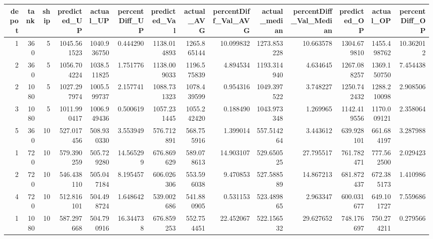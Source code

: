 \begin{tabular}{rrrrrrrrrrrrrr}
\toprule
 depot &  tank &  ship &  predicted\_UP &   actual\_UP &  percentDiff\_UP &  predicted\_Val &  actual\_AVG &  percentDiff\_Val\_AVG &  actual\_median &  percentDiff\_Val\_Median &  predicted\_OP &   actual\_OP &  percentDiff\_OP \\
\midrule
     1 &   360 &     5 &   1045.561523 & 1040.936750 &        0.444290 &    1138.014893 & 1265.865144 &            10.099832 &    1273.853228 &               10.663578 &   1304.679810 & 1455.498762 &       10.362012 \\
     2 &   360 &     5 &   1056.704224 & 1038.511825 &        1.751776 &    1138.009033 & 1196.575839 &             4.894534 &    1193.314940 &                4.634645 &   1267.088257 & 1369.150750 &        7.454438 \\
     2 &  1080 &     5 &   1027.297974 & 1005.599737 &        2.157741 &    1088.731323 & 1078.439599 &             0.954316 &    1049.397522 &                3.748227 &   1250.742432 & 1288.210098 &        2.908506 \\
     3 &  1080 &     5 &   1011.990417 & 1006.949436 &        0.500619 &    1057.231445 & 1055.242420 &             0.188490 &    1043.973348 &                1.269965 &   1142.419556 & 1170.009121 &        2.358064 \\
     5 &   360 &    10 &    527.017456 &  508.930330 &        3.553949 &     576.712891 &  568.755916 &             1.399014 &     557.514264 &                3.443612 &    639.928101 &  661.684197 &        3.287988 \\
     1 &   720 &    10 &    579.390259 &  505.729280 &       14.565299 &     676.869629 &  589.078613 &            14.903107 &     529.650525 &               27.795517 &    761.782471 &  777.562500 &        2.029423 \\
     2 &   720 &    10 &    546.438110 &  505.047184 &        8.195457 &     606.026306 &  553.596038 &             9.470853 &     527.588589 &               14.867213 &    681.872437 &  672.385173 &        1.410986 \\
     4 &   720 &    10 &    512.816101 &  504.498724 &        1.648642 &     539.002686 &  541.880905 &             0.531153 &     523.489865 &                2.963347 &    600.031677 &  649.101727 &        7.559686 \\
     1 &  1080 &    10 &    587.297668 &  504.790916 &       16.344738 &     676.859253 &  552.754451 &            22.452067 &     522.156532 &               29.627652 &    748.176697 &  750.274211 &        0.279566 \\

\end{tabular}
